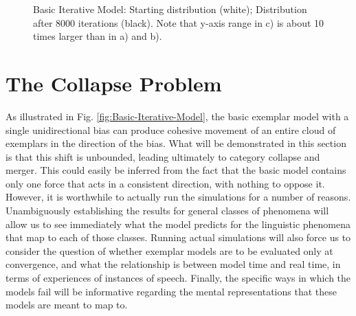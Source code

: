 \begin{figure}[H]

\hfill{}\hfill{}\caption{\label{fig:First Model param}Basic Iterative Model: Starting distribution
(white); Distribution after 8000 iterations (black). Note that y-axis
range in c) is about 10 times larger than in a) and b). }

\end{figure}


\section{\label{sec:Iterativity}The Collapse Problem}

As illustrated in Fig. \ref{fig:Basic-Iterative-Model}, the basic
exemplar model with a single unidirectional bias can produce cohesive
movement of an entire cloud of exemplars in the direction of the bias.
What will be demonstrated in this section is that this shift is unbounded,
leading ultimately to category collapse and merger. This could easily
be inferred from the fact that the basic model contains only one force
that acts in a consistent direction, with nothing to oppose it. However,
it is worthwhile to actually run the simulations for a number of reasons.
Unambiguously establishing the results for general classes of phenomena
will allow us to see immediately what the model predicts for the linguistic
phenomena that map to each of those classes. Running actual simulations
will also force us to consider the question of whether exemplar models
are to be evaluated only at convergence, and what the relationship
is between model time and real time, in terms of experiences of instances
of speech. Finally, the specific ways in which the models fail will
be informative regarding the mental representations that these models
are meant to map to. 

